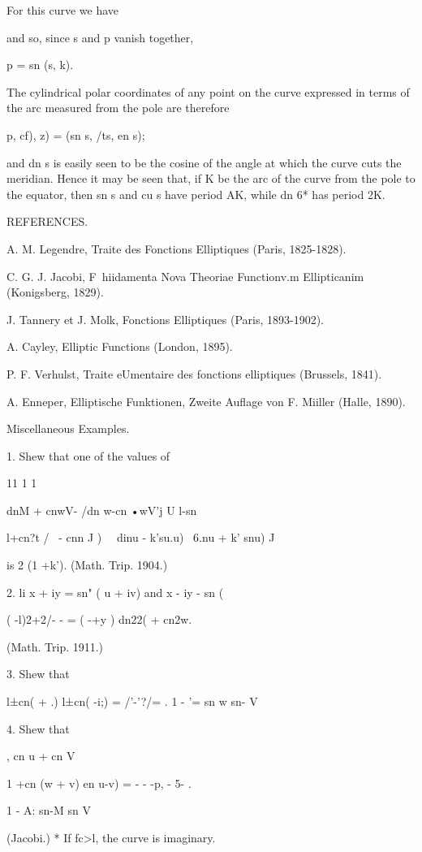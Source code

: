 For this curve we have

and so, since s and p vanish together,

p = sn (s, k).

The cylindrical polar coordinates of any point on the curve expressed
in terms of the arc measured from the pole are therefore

 p, cf), z) = (sn s, /ts, en s);

and dn s is easily seen to be the cosine of the angle at which the
curve cuts the meridian. Hence it may be seen that, if K be the arc of
the curve from the pole to the equator, then sn s and cu s have period
AK, while dn 6* has period 2K.

REFERENCES.

A. M. Legendre, Traite des Fonctions Elliptiques (Paris, 1825-1828).

C. G. J. Jacobi, F\ hiidamenta Nova Theoriae Functionv.m Ellipticanim
(Konigsberg, 1829).

J. Tannery et J. Molk, Fonctions Elliptiques (Paris, 1893-1902).

A. Cayley, Elliptic Functions (London, 1895).

P. F. Verhulst, Traite eUmentaire des fonctions elliptiques (Brussels,
1841).

A. Enneper, Elliptische Funktionen, Zweite Auflage von F. Miiller
(Halle, 1890).

Miscellaneous Examples.

1. Shew that one of the values of

11 1 1

dnM + cnwV- /dn w-cn •wV'j U l-sn%

l+cn?t / \ - cnn J ) \ \ dinu - k'su.u) \ 6.nu + k' snu) J

is 2 (1 +k'). (Math. Trip. 1904.)

2. li x + iy = sn" ( u + iv) and x - iy - sn (%

 ( -l)2+2/- - = ( -+y ) dn22( + cn2w.

(Math. Trip. 1911.)

3. Shew that

 l±cn( + .) l±cn( -i;) = /'-'?/= . 1 - '= sn w sn- V

4. Shew that

, cn u + cn V

1 +cn (w + v) en u-v) = - - -p, - 5- .

  1 - A: sn-M sn V

(Jacobi.) * If fc>l, the curve is imaginary.

